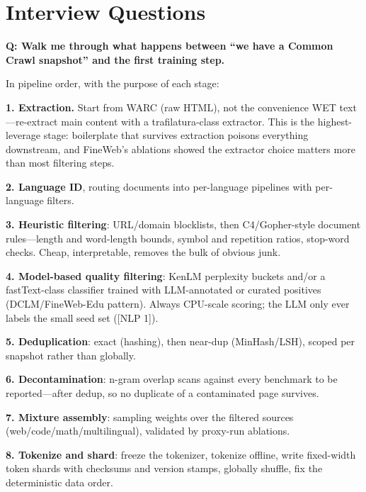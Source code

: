 \section{Interview Questions}
\label{sec:pretrain_interview}

\begin{interviewq}
\textbf{Q: Walk me through what happens between ``we have a Common Crawl snapshot'' and the first training step.}

 \quad {} \quad \badgefreq{\freqhigh}

\stronganswer
In pipeline order, with the purpose of each stage:

\textbf{1. Extraction.} Start from WARC (raw HTML), not the convenience WET text---re-extract main content with a trafilatura-class extractor. This is the highest-leverage stage: boilerplate that survives extraction poisons everything downstream, and FineWeb's ablations showed the extractor choice matters more than most filtering steps.

\textbf{2. Language ID}, routing documents into per-language pipelines with per-language filters.

\textbf{3. Heuristic filtering}: URL/domain blocklists, then C4/Gopher-style document rules---length and word-length bounds, symbol and repetition ratios, stop-word checks. Cheap, interpretable, removes the bulk of obvious junk.

\textbf{4. Model-based quality filtering}: KenLM perplexity buckets and/or a fastText-class classifier trained with LLM-annotated or curated positives (DCLM/FineWeb-Edu pattern). Always CPU-scale scoring; the LLM only ever labels the small seed set ([NLP 1]).

\textbf{5. Deduplication}: exact (hashing), then near-dup (MinHash/LSH), scoped per snapshot rather than globally.

\textbf{6. Decontamination}: n-gram overlap scans against every benchmark to be reported---after dedup, so no duplicate of a contaminated page survives.

\textbf{7. Mixture assembly}: sampling weights over the filtered sources (web/code/math/multilingual), validated by proxy-run ablations.

\textbf{8. Tokenize and shard}: freeze the tokenizer, tokenize offline, write fixed-width token shards with checksums and version stamps, globally shuffle, fix the deterministic data order.


\end{interviewq}

